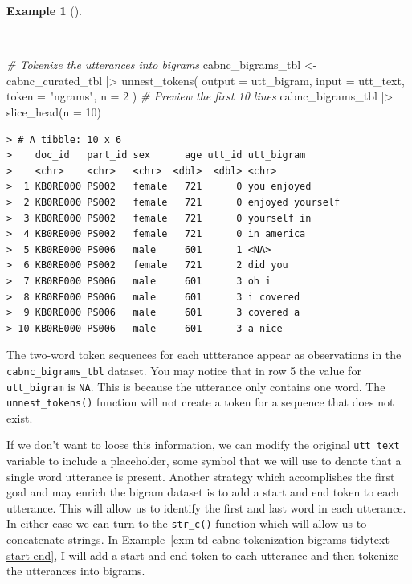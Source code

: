 \documentclass[
  letterpaper,
  DIV=11,
  numbers=noendperiod]{scrreport}
\newenvironment{Shaded}{\begin{snugshade}}{\end{snugshade}}
\newcommand{\AttributeTok}[1]{\textcolor[rgb]{0.00,0.00,0.00}{#1}}
\newcommand{\CommentTok}[1]{\textcolor[rgb]{0.00,0.00,0.00}{\textit{#1}}}
\newcommand{\DecValTok}[1]{\textcolor[rgb]{0.00,0.00,0.00}{#1}}
\newcommand{\FunctionTok}[1]{\textcolor[rgb]{0.00,0.00,0.00}{#1}}
\newcommand{\NormalTok}[1]{\textcolor[rgb]{0.00,0.00,0.00}{#1}}
\newcommand{\OtherTok}[1]{\textcolor[rgb]{0.00,0.00,0.00}{#1}}
\newcommand{\SpecialCharTok}[1]{\textcolor[rgb]{0.00,0.00,0.00}{#1}}
\newcommand{\StringTok}[1]{\textcolor[rgb]{0.00,0.00,0.00}{#1}}
\theoremstyle{definition}
\newtheorem{example}{Example}[chapter]
\theoremstyle{remark}
\begin{document}
\begin{example}[]\protect\hypertarget{exm-td-cabnc-tokenization-bigrams-tidytext}{}\label{exm-td-cabnc-tokenization-bigrams-tidytext}

~

\begin{Shaded}
\begin{Highlighting}[]
\CommentTok{\# Tokenize the utterances into bigrams}
\NormalTok{cabnc\_bigrams\_tbl }\OtherTok{\textless{}{-}} 
\NormalTok{  cabnc\_curated\_tbl }\SpecialCharTok{|\textgreater{}}
  \FunctionTok{unnest\_tokens}\NormalTok{(}
    \AttributeTok{output =}\NormalTok{ utt\_bigram, }
    \AttributeTok{input =}\NormalTok{ utt\_text, }
    \AttributeTok{token =} \StringTok{"ngrams"}\NormalTok{,}
    \AttributeTok{n =} \DecValTok{2}
\NormalTok{  )}
\CommentTok{\# Preview the first 10 lines}
\NormalTok{cabnc\_bigrams\_tbl }\SpecialCharTok{|\textgreater{}}
  \FunctionTok{slice\_head}\NormalTok{(}\AttributeTok{n =} \DecValTok{10}\NormalTok{)}
\end{Highlighting}
\end{Shaded}

\begin{verbatim}
> # A tibble: 10 x 6
>    doc_id   part_id sex      age utt_id utt_bigram      
>    <chr>    <chr>   <chr>  <dbl>  <dbl> <chr>           
>  1 KB0RE000 PS002   female   721      0 you enjoyed     
>  2 KB0RE000 PS002   female   721      0 enjoyed yourself
>  3 KB0RE000 PS002   female   721      0 yourself in     
>  4 KB0RE000 PS002   female   721      0 in america      
>  5 KB0RE000 PS006   male     601      1 <NA>            
>  6 KB0RE000 PS002   female   721      2 did you         
>  7 KB0RE000 PS006   male     601      3 oh i            
>  8 KB0RE000 PS006   male     601      3 i covered       
>  9 KB0RE000 PS006   male     601      3 covered a       
> 10 KB0RE000 PS006   male     601      3 a nice
\end{verbatim}

\end{example}

The two-word token sequences for each uttterance appear as observations
in the \texttt{cabnc\_bigrams\_tbl} dataset. You may notice that in row
5 the value for \texttt{utt\_bigram} is \texttt{NA}. This is because the
utterance only contains one word. The \texttt{unnest\_tokens()} function
will not create a token for a sequence that does not exist.

If we don't want to loose this information, we can modify the original
\texttt{utt\_text} variable to include a placeholder, some symbol that
we will use to denote that a single word utterance is present. Another
strategy which accomplishes the first goal and may enrich the bigram
dataset is to add a start and end token to each utterance. This will
allow us to identify the first and last word in each utterance. In
either case we can turn to the \texttt{str\_c()} function which will
allow us to concatenate strings. In
Example~\ref{exm-td-cabnc-tokenization-bigrams-tidytext-start-end}, I
will add a start and end token to each utterance and then tokenize the
utterances into bigrams.
\end{document}
